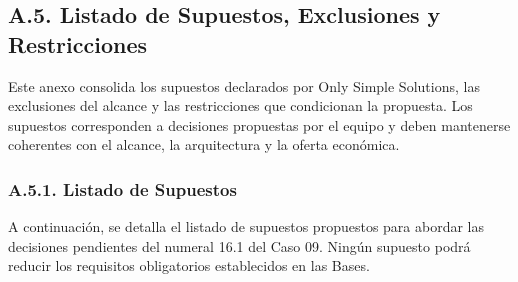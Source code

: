 \documentclass[11pt]{article}
\begin{document}
\subsection{A.5. Listado de Supuestos, Exclusiones y Restricciones}\label{a-5-listado-de-supuestos-exclusiones-y-restricciones}

Este anexo consolida los supuestos declarados por Only Simple Solutions, las exclusiones del alcance y las restricciones que condicionan la propuesta. Los supuestos corresponden a decisiones propuestas por el equipo y deben mantenerse coherentes con el alcance, la arquitectura y la oferta económica.

\subsubsection{A.5.1. Listado de Supuestos}\label{a-5-1-listado-de-supuestos}

A continuación, se detalla el listado de supuestos propuestos para abordar las decisiones pendientes del numeral 16.1 del Caso 09. Ningún supuesto podrá reducir los requisitos obligatorios establecidos en las Bases.
\end{document}

